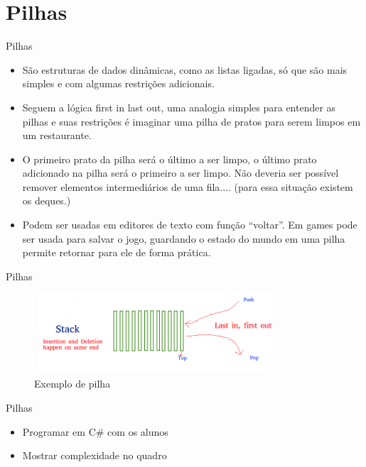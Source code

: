 \section{Pilhas}

\begin{frame}
	\begin{block}{Pilhas}
		\begin{itemize}
			\item São estruturas de dados dinâmicas, como as listas ligadas, só que são mais simples e com algumas restrições adicionais.
			
			\item Seguem a lógica first in last out, uma analogia simples para entender as pilhas e suas restrições é imaginar uma pilha de pratos para serem limpos em um restaurante.
			
			\item O primeiro prato da pilha será o último a ser limpo, o último prato adicionado na pilha será o primeiro a ser limpo. Não deveria ser possível remover elementos intermediários de uma fila.... (para essa situação existem os deques.)
			
			\item Podem ser usadas em editores de texto com função “voltar”. Em games pode ser usada para salvar o jogo, guardando o estado do mundo em uma pilha permite retornar para ele de forma prática.
		\end{itemize}
	\end{block}
\end{frame}

\begin{frame}
	\begin{block}{Pilhas}
		\begin{figure}[!htb]
			\centering	  				
			\includegraphics[height=3cm, width = 9cm]{./pic/stack.png}
			\caption{Exemplo de pilha \cite{GEEKS_2018}}
			\label{fig_pilha}
		\end{figure}
	\end{block}
\end{frame}

\begin{frame}
	\begin{block}{Pilhas}
		\begin{itemize}
			\item Programar em C\# com os alunos
			\item Mostrar complexidade no quadro
		\end{itemize}
	\end{block}
\end{frame}

